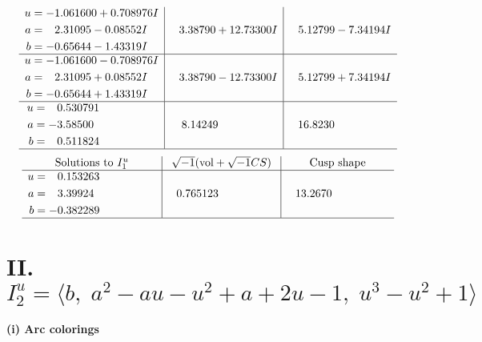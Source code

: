 \documentclass[1p]{elsarticle_modified}
\theoremstyle{definition}
\newcommand{\I}{\sqrt{-1}}
\begin{document}
$$\begin{array}{c|c|c}
\begin{aligned}
u &= -1.061600 + 0.708976 I \\
a &= \phantom{-}2.31095 - 0.08552 I \\
b &= -0.65644 - 1.43319 I\end{aligned}
 & \phantom{-}3.38790 + 12.73300 I & \phantom{-}5.12799 - 7.34194 I \\ \hline\begin{aligned}
u &= -1.061600 - 0.708976 I \\
a &= \phantom{-}2.31095 + 0.08552 I \\
b &= -0.65644 + 1.43319 I\end{aligned}
 & \phantom{-}3.38790 - 12.73300 I & \phantom{-}5.12799 + 7.34194 I \\ \hline\begin{aligned}
u &= \phantom{-}0.530791\phantom{ +0.000000I} \\
a &= -3.58500\phantom{ +0.000000I} \\
b &= \phantom{-}0.511824\phantom{ +0.000000I}\end{aligned}
 & \phantom{-}8.14249\phantom{ +0.000000I} & \phantom{-}16.8230\phantom{ +0.000000I}\\
 \hline 
 \end{array}$$\newpage$$\begin{array}{c|c|c}  
\text{Solutions to }I^u_{1}& \I (\text{vol} + \sqrt{-1}CS) & \text{Cusp shape}\\
 \hline 
\begin{aligned}
u &= \phantom{-}0.153263\phantom{ +0.000000I} \\
a &= \phantom{-}3.39924\phantom{ +0.000000I} \\
b &= -0.382289\phantom{ +0.000000I}\end{aligned}
 & \phantom{-}0.765123\phantom{ +0.000000I} & \phantom{-}13.2670\phantom{ +0.000000I}\\
 \hline 
 \end{array}$$\newpage\newpage\renewcommand{\arraystretch}{1}
\centering \section*{II. $I^u_{2}= \langle b,\;a^2- a u- u^2+a+2 u-1,\;u^3- u^2+1 \rangle$}
\flushleft \textbf{(i) Arc colorings}\\
\end{document}
